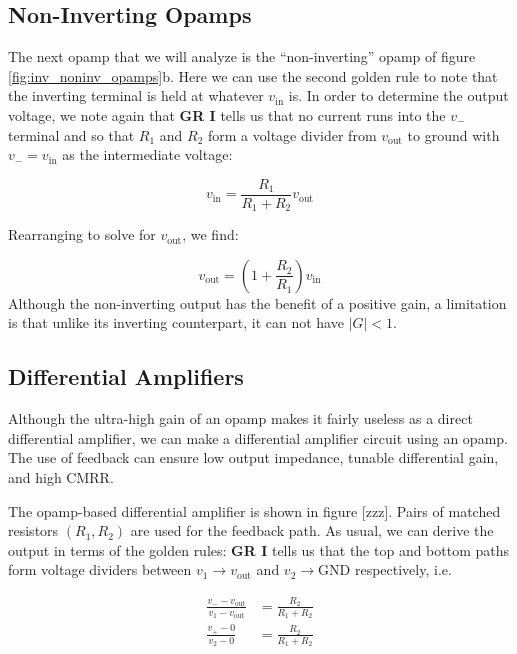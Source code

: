 \documentclass{tufte-book}
\begin{document}
\subsection{Non-Inverting Opamps}
The next opamp that we will analyze is the ``non-inverting'' opamp of figure \ref{fig:inv_noninv_opamps}b. Here we can use the second golden rule to note that the inverting terminal is held at whatever $v_\text{in}$ is. In order to determine the output voltage, we note again that \textbf{GR I} tells us that no current runs into the $v_-$ terminal and so that $R_1$ and $R_2$ form a voltage divider from $v_\text{out}$ to ground with $v_- = v_\text{in}$ as the intermediate voltage:

\begin{equation}
\label{eq:noninverting_opamp_deriv_1}
v_\text{in} = \frac{R_1}{R_1 + R_2}v_\text{out}
\end{equation}

Rearranging to solve for $v_\text{out}$, we find: 

\begin{equation}
\label{eq:noninverting_opamp}
v_\text{out} = \left(1+\frac{R_2}{R_1}\right)v_\text{in}
\end{equation}
Although the non-inverting output has the benefit of a positive gain, a limitation is that unlike its inverting counterpart, it can not have $\vert G\vert < 1$.

\subsection{Differential Amplifiers}
Although the ultra-high gain of an opamp makes it fairly useless as a direct differential amplifier, we can make a differential amplifier circuit using an opamp. The use of feedback can ensure low output impedance, tunable differential gain, and high CMRR.

The opamp-based differential amplifier is shown in figure [zzz]. Pairs of matched resistors $\left(R_1,R_2\right)$ are used for the feedback path. As usual, we can derive the output in terms of the golden rules: \textbf{GR I} tells us that the top and bottom paths form voltage dividers between $v_1\rightarrow v_\text{out}$ and $v_2\rightarrow \text{GND}$ respectively, i.e.

\begin{align*}
\frac{v_--v_\text{out}}{v_1-v_\text{out}} &= \frac{R_2}{R_1+R_2} \\
\frac{v_+-0}{v_2-0} &= \frac{R_2}{R_1+R_2} 
\end{align*}
\end{document}
